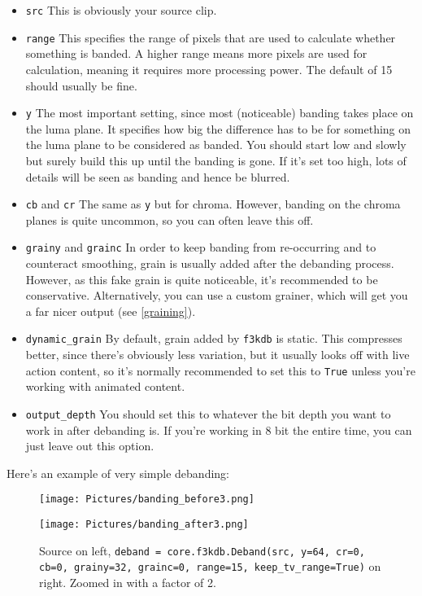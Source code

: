 \documentclass{scrartcl}
\begin{document}
\begin{itemize}
\item \texttt{src} This is obviously your source clip.
\item \texttt{range} This specifies the range of pixels that are used to calculate whether something is banded.  A higher range means more pixels are used for calculation, meaning it requires more processing power.  The default of 15 should usually be fine.
\item \texttt{y} The most important setting, since most (noticeable) banding takes place on the luma plane.  It specifies how big the difference has to be for something on the luma plane to be considered as banded.  You should start low and slowly but surely build this up until the banding is gone.  If it's set too high, lots of details will be seen as banding and hence be blurred.
\item \texttt{cb} and \texttt{cr}  The same as \texttt{y} but for chroma.  However, banding on the chroma planes is quite uncommon, so you can often leave this off.
\item \texttt{grainy} and \texttt{grainc}  In order to keep banding from re-occurring and to counteract smoothing, grain is usually added after the debanding process.  However, as this fake grain is quite noticeable, it's recommended to be conservative.  Alternatively, you can use a custom grainer, which will get you a far nicer output (see \ref{graining}).
\item \texttt{dynamic\_grain}  By default, grain added by \texttt{f3kdb} is static.  This compresses better, since there's obviously less variation, but it usually looks off with live action content, so it's normally recommended to set this to \texttt{True} unless you're working with animated content.
\item \texttt{output\_depth} You should set this to whatever the bit depth you want to work in after debanding is.  If you're working in 8 bit the entire time, you can just leave out this option.
\end{itemize}
Here's an example of very simple debanding:

\begin{figure}[h]
\begin{minipage}{.5\textwidth}
\centering
\texttt{[image: Pictures/banding\_before3.png]}
\end{minipage}
\begin{minipage}{.5\textwidth}
\centering
\texttt{[image: Pictures/banding\_after3.png]}
\end{minipage}
\caption{Source on left, \texttt{deband = core.f3kdb.Deband(src, y=64, cr=0, cb=0, grainy=32, grainc=0, range=15, keep\_tv\_range=True)} on right.  Zoomed in with a factor of 2.}\label{fig:1}
\end{figure}
\end{document}
